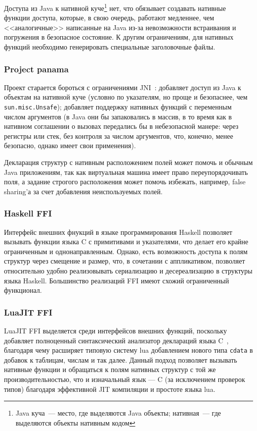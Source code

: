 \documentclass[times
]{itmo-student-thesis}
\begin{document}
Доступа из Java к нативной куче\footnote{Java куча~--- место, где выделяются Java объекты; нативная~--- где выделяются объекты нативным кодом} нет, что обязывает создавать нативные функции доступа, которые, в свою очередь, работают медленнее, чем <<аналогичные>> написанные на Java из-за невозможности встраивания и погружения в безопасное состояние. К другим ограничениям, для нативных функций необходимо генерировать специальные заголовочные файлы.

\subsubsection{Project panama}
Проект старается бороться с ограничениями JNI~\cite{project-panama-overview}: добавляет доступ из Java к объектам на нативной куче (условно по указателям, но проще и безопаснее, чем \texttt{sun.misc.Unsafe}); добавляет поддержку нативных функций с переменным числом аргументов (в Java они бы запаковались в массив, в то время как в нативном соглашении о вызовах передались бы в небезопасной манере: через регистры или стек, без контроля за числом аргументов, что, конечно, менее безопасно, однако имеет свои применения).

Декларация структур с нативным расположением полей может помочь и обычным Java приложениям, так как виртуальная машина имеет право переупорядочивать поля, а задание строгого расположения может помочь избежать, например, false sharing'а за счет добавления неиспользуемых полей.
\subsubsection{Haskell FFI}
Интерфейс внешних фнукций в языке программирования Haskell позволяет вызывать функции языка C с примитивами и указателями, что делает его крайне ограниченным и однонаправленным. Однако, есть возможность доступа к полям структур через смещение и размер, что, в сочетании с аппликативом, позволяет относительно удобно реализовывать сериализацию и десереализацию в структуры языка Haskell. Большинство реализаций FFI имеют схожий ограниченный функционал.
\subsubsection{LuaJIT FFI}\label{intro:luajitffi}
LuaJIT FFI выделяется среди интерфейсов внешних функций, поскольку добавляет полноценный синтаксический анализатор деклараций языка C~\cite{luajit}, благодаря чему расширяет типовую систему lua добавлением нового типа \texttt{cdata} в добавок к таблицам, числам и так далее. Данный подход позволяет вызывать нативные функции и обращаться к полям нативных структур с той же производительностью, что и изначальный язык --- C (за исключением проверок типов) благодаря эффективной JIT компиляции и простоте языка lua.
\end{document}
